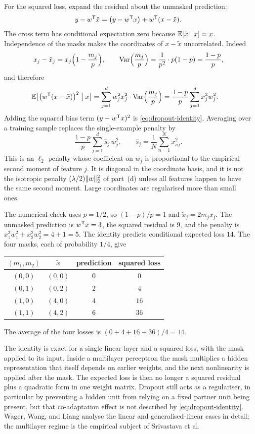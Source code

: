 For the squared loss, expand the residual about the unmasked prediction:
\[
  y - w^{\mathsf{T}}\tilde x
  =
  \bigl(y-w^{\mathsf{T}} x\bigr) + w^{\mathsf{T}}(x-\tilde x).
\]
The cross term has conditional expectation zero because \(\mathbb{E}[\tilde x\mid x] = x\). Independence of the masks makes the coordinates of \(x-\tilde x\) uncorrelated. Indeed
\[
  x_j-\tilde x_j = x_j\Bigl(1-\frac{m_j}{p}\Bigr),
  \qquad
  \operatorname{Var}\Bigl(\frac{m_j}{p}\Bigr)
  =
  \frac{1}{p^2}\cdot p(1-p)
  =
  \frac{1-p}{p},
\]
and therefore
\begin{align*}
  \mathbb{E}\bigl[\bigl(w^{\mathsf{T}}(x-\tilde x)\bigr)^2 \bigm| x\bigr]
  &=
  \sum_{j=1}^{d} w_j^2 x_j^2\cdot\operatorname{Var}\Bigl(\frac{m_j}{p}\Bigr)
  =
  \frac{1-p}{p}\sum_{j=1}^{d} x_j^2 w_j^2.
\end{align*}
Adding the squared bias term \((y-w^{\mathsf{T}} x)^2\) is \eqref{eq:dropout-identity}. Averaging over a training sample replaces the single-example penalty by
\[
  \frac{1-p}{p}\sum_{j=1}^{d}\hat s_j\, w_j^2,
  \qquad
  \hat s_j = \frac1N\sum_{n=1}^N x_{nj}^2.
\]
This is an \(\ell_2\) penalty whose coefficient on \(w_j\) is proportional to the empirical second moment of feature \(j\). It is diagonal in the coordinate basis, and it is not the isotropic penalty \((\lambda/2)\lVert w\rVert_2^2\) of part~(d) unless all features happen to have the same second moment. Large coordinates are regularised more than small ones.

The numerical check uses \(p=1/2\), so \((1-p)/p=1\) and \(\tilde x_j = 2 m_j x_j\). The unmasked prediction is \(w^{\mathsf{T}} x = 3\), the squared residual is \(9\), and the penalty is \(x_1^2 w_1^2 + x_2^2 w_2^2 = 4+1 = 5\). The identity predicts conditional expected loss \(14\). The four masks, each of probability \(1/4\), give
\begin{center}
\begin{tabular}{@{}cccc@{}}
\toprule
\((m_1,m_2)\) & \(\tilde x\) & prediction & squared loss \\
\midrule
\((0,0)\) & \((0,0)\) & \(0\) & \(0\) \\
\((0,1)\) & \((0,2)\) & \(2\) & \(4\) \\
\((1,0)\) & \((4,0)\) & \(4\) & \(16\) \\
\((1,1)\) & \((4,2)\) & \(6\) & \(36\) \\
\bottomrule
\end{tabular}
\end{center}
The average of the four losses is \((0+4+16+36)/4 = 14\).

The identity is exact for a single linear layer and a squared loss, with the mask applied to its input. Inside a multilayer perceptron the mask multiplies a hidden representation that itself depends on earlier weights, and the next nonlinearity is applied after the mask. The expected loss is then no longer a squared residual plus a quadratic form in one weight matrix. Dropout still acts as a regulariser, in particular by preventing a hidden unit from relying on a fixed partner unit being present, but that co-adaptation effect is not described by \eqref{eq:dropout-identity}. Wager, Wang, and Liang analyse the linear and generalised-linear cases in detail; the multilayer regime is the empirical subject of Srivastava et al.


